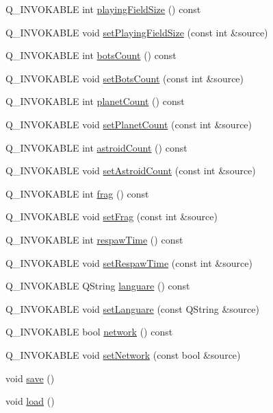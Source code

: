 \begin{DoxyCompactItemize}
\item 
Q\+\_\+\+I\+N\+V\+O\+K\+A\+B\+L\+E int \hyperlink{class_gravitron_settings_ac42974dae44eec47f9188ead3b950251}{playing\+Field\+Size} () const 
\item 
Q\+\_\+\+I\+N\+V\+O\+K\+A\+B\+L\+E void \hyperlink{class_gravitron_settings_aaceaf8068d09b9e22d8085c6ca3db2d8}{set\+Playing\+Field\+Size} (const int \&source)
\item 
Q\+\_\+\+I\+N\+V\+O\+K\+A\+B\+L\+E int \hyperlink{class_gravitron_settings_a0111fc2b9a795979bc59026ae6bf9193}{bots\+Count} () const 
\item 
Q\+\_\+\+I\+N\+V\+O\+K\+A\+B\+L\+E void \hyperlink{class_gravitron_settings_ac2ec7898b33cbd349497c59f69ee7c1d}{set\+Bots\+Count} (const int \&source)
\item 
Q\+\_\+\+I\+N\+V\+O\+K\+A\+B\+L\+E int \hyperlink{class_gravitron_settings_aeb6526e7912b3aa7a402de993bb81981}{planet\+Count} () const 
\item 
Q\+\_\+\+I\+N\+V\+O\+K\+A\+B\+L\+E void \hyperlink{class_gravitron_settings_a1bb8463107c3236fd2610c657b4ffe59}{set\+Planet\+Count} (const int \&source)
\item 
Q\+\_\+\+I\+N\+V\+O\+K\+A\+B\+L\+E int \hyperlink{class_gravitron_settings_a4e31985e206c8e62adeddcf90b86d3b4}{astroid\+Count} () const 
\item 
Q\+\_\+\+I\+N\+V\+O\+K\+A\+B\+L\+E void \hyperlink{class_gravitron_settings_a0f48fe8d1d9fc850ac5272fffdc66c45}{set\+Astroid\+Count} (const int \&source)
\item 
Q\+\_\+\+I\+N\+V\+O\+K\+A\+B\+L\+E int \hyperlink{class_gravitron_settings_aaa360d47801ac1c5a32085d899ec09fd}{frag} () const 
\item 
Q\+\_\+\+I\+N\+V\+O\+K\+A\+B\+L\+E void \hyperlink{class_gravitron_settings_a68c312fe2c90b7aa39951751ffdc0be6}{set\+Frag} (const int \&source)
\item 
Q\+\_\+\+I\+N\+V\+O\+K\+A\+B\+L\+E int \hyperlink{class_gravitron_settings_ac80d618a1e99de9bc697827e3b5c0749}{respaw\+Time} () const 
\item 
Q\+\_\+\+I\+N\+V\+O\+K\+A\+B\+L\+E void \hyperlink{class_gravitron_settings_a4263bace900a630e49d498114102b181}{set\+Respaw\+Time} (const int \&source)
\item 
Q\+\_\+\+I\+N\+V\+O\+K\+A\+B\+L\+E Q\+String \hyperlink{class_gravitron_settings_a334450cf29acbebb01262a5d945f7e24}{languare} () const 
\item 
Q\+\_\+\+I\+N\+V\+O\+K\+A\+B\+L\+E void \hyperlink{class_gravitron_settings_a1c457b47d88c01a5c3541f3c861fcda6}{set\+Languare} (const Q\+String \&source)
\item 
Q\+\_\+\+I\+N\+V\+O\+K\+A\+B\+L\+E bool \hyperlink{class_gravitron_settings_aab42e5f608b9e46d077a1418cd9d709d}{network} () const 
\item 
Q\+\_\+\+I\+N\+V\+O\+K\+A\+B\+L\+E void \hyperlink{class_gravitron_settings_a27abb8747f90faa675cf875962a4cb17}{set\+Network} (const bool \&source)
\item 
void \hyperlink{class_gravitron_settings_a058ae43b2b186753956a8f9e4c54234b}{save} ()
\item 
void \hyperlink{class_gravitron_settings_ad7226f0a103f0aea9786904a537ef1c1}{load} ()
\end{DoxyCompactItemize}
